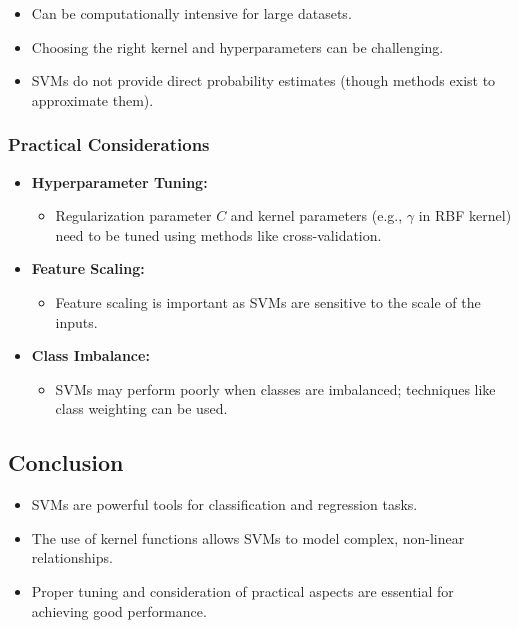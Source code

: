 \documentclass{article}
\begin{document}
\begin{itemize}
    \item Can be computationally intensive for large datasets.
    \item Choosing the right kernel and hyperparameters can be challenging.
    \item SVMs do not provide direct probability estimates (though methods exist to approximate them).
\end{itemize}

\subsubsection{Practical Considerations}

\begin{itemize}
    \item \textbf{Hyperparameter Tuning:}
    \begin{itemize}
        \item Regularization parameter $C$ and kernel parameters (e.g., $\gamma$ in RBF kernel) need to be tuned using methods like cross-validation.
    \end{itemize}
    \item \textbf{Feature Scaling:}
    \begin{itemize}
        \item Feature scaling is important as SVMs are sensitive to the scale of the inputs.
    \end{itemize}
    \item \textbf{Class Imbalance:}
    \begin{itemize}
        \item SVMs may perform poorly when classes are imbalanced; techniques like class weighting can be used.
    \end{itemize}
\end{itemize}

\subsection{Conclusion}

\begin{itemize}
    \item SVMs are powerful tools for classification and regression tasks.
    \item The use of kernel functions allows SVMs to model complex, non-linear relationships.
    \item Proper tuning and consideration of practical aspects are essential for achieving good performance.
\end{itemize}
\end{document}
